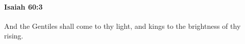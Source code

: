 
		\paragraph{Isaiah 60:3} %
			\label{ISAIAH-60-3}

			And the Gentiles shall come to thy light, and kings to the brightness of thy rising.


